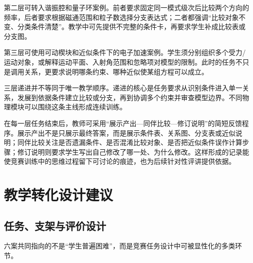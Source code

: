 \documentclass[
  12pt,
  a4paper]{ctexbook}
\begin{document}
第二层可转入谐振腔和量子环案例。前者要求固定同一模式级次后比较两个方向的频率，后者要求根据磁通范围和粒子数选择分支表达式；二者都强调``比较对象不变、分类条件清楚''。教学中可先提供不完整的条件卡，再要求学生补成比较表或分支图。

第三层可使用可动楔块和近似条件下的电子加速案例。学生须分别组织多个受力/运动对象，或解释运动平面、入射角范围和忽略项对模型的限制。此时的任务不只是调用关系，更要求说明哪条约束、哪种近似使某组方程可以成立。

三层递进并不等同于唯一教学顺序。递进的核心是任务要求从识别条件进入单一关系，发展到依据条件建立比较或分支，再到协调多个约束并审查模型边界。不同物理模块可以围绕这条主线形成连续训练。

在每一层任务结束后，教师可采用``展示产出---同伴比较---修订说明''的简短反馈程序。展示产出不是只展示最终答案，而是展示条件表、关系图、分支表或近似说明；同伴比较关注是否遗漏条件、是否混淆比较对象、是否把近似条件误作计算步骤；修订说明则要求学生写出自己修改了哪一处、为什么修改。这样形成的记录能使竞赛训练中的思维过程留下可讨论的痕迹，也为后续针对性评讲提供依据。

\section{教学转化设计建议}\label{ux6559ux5b66ux8f6cux5316ux8bbeux8ba1ux5efaux8bae}

\subsection{任务、支架与评价设计}\label{ux4efbux52a1ux652fux67b6ux4e0eux8bc4ux4ef7ux8bbeux8ba1}

六案共同指向的不是``学生普遍困难''，而是竞赛任务设计中可被显性化的多类环节。
\end{document}
